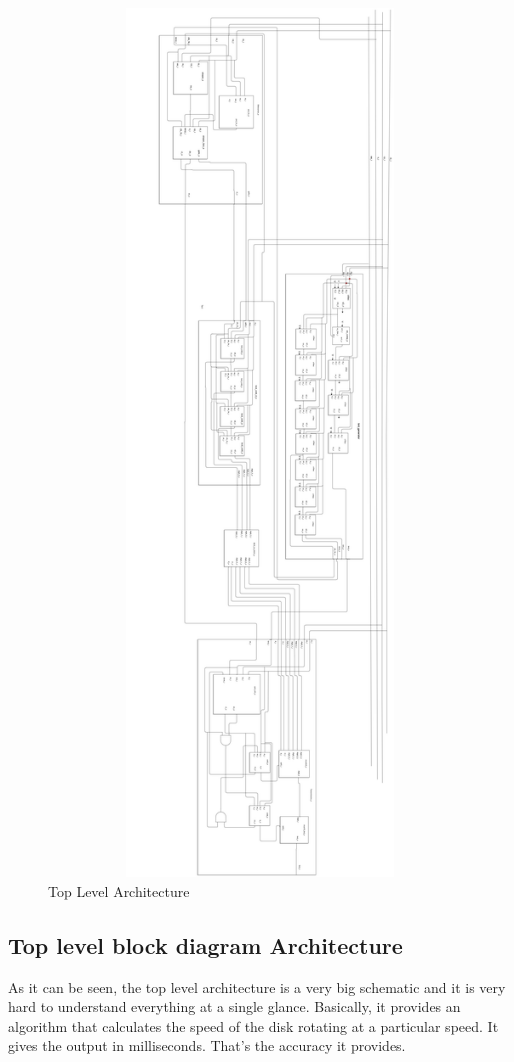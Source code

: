 \documentclass[12pt,a4paper]{article}
\begin{document}
\begin{figure}[H]
\centering
\includegraphics[width=16cm,height=23cm]{Toplevel.jpg}
\caption{Top Level Architecture}
\label{Top Level Architecture}
\end{figure}
\newpage



\subsection{Top level block diagram Architecture}
As it can be seen, the top level architecture is a very big schematic and it is very hard to understand everything at a single glance. Basically, it provides an algorithm that calculates the speed of the disk rotating at a particular speed. It gives the output in milliseconds. That’s the accuracy it provides. \
\end{document}
